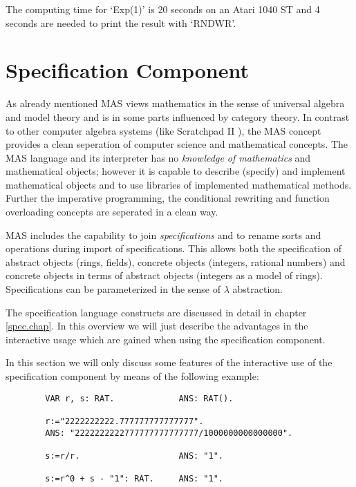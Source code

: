 The computing time for `Exp(1)' is 20 seconds
on an Atari 1040 ST and 4 seconds are needed to 
print the result with `RNDWR'. 


\section{Specification Component}

As already mentioned MAS views mathematics in the 
sense of universal algebra and model theory and is 
in some parts influenced by category theory.
In contrast to other computer algebra systems
(like Scratchpad II \cite{Jenks 85}),
the MAS concept provides a clean seperation of 
computer science and mathematical concepts. 
The MAS language and its interpreter has no 
{\em knowledge of mathematics} and mathematical objects; 
however it is capable to describe (specify) and implement 
mathematical objects and to 
use libraries of implemented mathematical methods. 
Further the imperative programming, the conditional rewriting 
and function overloading concepts are seperated in a clean way.

MAS includes the capability to 
join {\em specifications} and to rename sorts and operations 
during import of specifications. 
This allows both the specification of abstract objects 
(rings, fields),
concrete objects (integers, rational numbers) and 
concrete objects in terms of abstract objects 
(integers as a model of rings). 
Specifications can be parameterized in the sense of 
$\lambda$ abstraction.

The specification language constructs are discussed 
in detail in chapter \ref{spec.chap}. 
In this overview we will just 
describe the advantages in the interactive usage 
which are gained when using the specification component.

In this section we will only discuss some features 
of the interactive use of the specification component 
by means of the following example:

\begin{verbatim}
        VAR r, s: RAT.             ANS: RAT().

        r:="2222222222.777777777777777".
        ANS: "2222222222777777777777777/1000000000000000".

        s:=r/r.                    ANS: "1".

        s:=r^0 + s - "1": RAT.     ANS: "1".
\end{verbatim}

